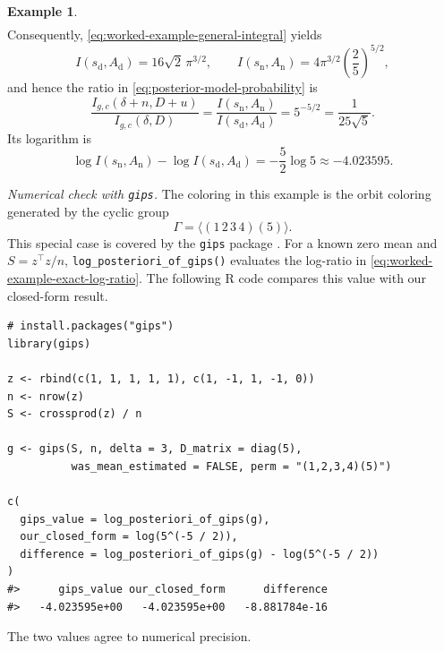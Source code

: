 \documentclass[12pt]{amsart}
\theoremstyle{plain}
\theoremstyle{definition}
\newtheorem{example}[theorem]{Example}
\theoremstyle{remark}
\newcommand{\1}{\mathbf{1}}
\begin{document}
\begin{example}
\[\begin{aligned}
\end{aligned}
\]
Consequently, \eqref{eq:worked-example-general-integral} yields
\[
I(s_{\mathrm{d}},A_{\mathrm{d}})
=16\sqrt2\,\pi^{3/2},
\qquad
I(s_{\mathrm{n}},A_{\mathrm{n}})
=4\pi^{3/2}\left(\frac25\right)^{5/2},
\]
and hence the ratio in \eqref{eq:posterior-model-probability} is
\begin{equation}\label{eq:worked-example-exact-ratio}
\frac{I_{g,c}(\delta+n,D+u)}{I_{g,c}(\delta,D)}
=\frac{I(s_{\mathrm{n}},A_{\mathrm{n}})}
{I(s_{\mathrm{d}},A_{\mathrm{d}})}
=5^{-5/2}=\frac{1}{25\sqrt5}.
\end{equation}
Its logarithm is
\begin{equation}\label{eq:worked-example-exact-log-ratio}
\log I(s_{\mathrm{n}},A_{\mathrm{n}})
-\log I(s_{\mathrm{d}},A_{\mathrm{d}})
=-\frac52\log5
\approx -4.023595.
\end{equation}


\noindent\emph{Numerical check with \texttt{gips}.}
The coloring in this example is the orbit coloring generated by the
cyclic group
\[
\Gamma=\langle(1\,2\,3\,4)(5)\rangle.
\]
This special case is covered by the \texttt{gips} package \citep{gips}.
For a known zero mean and $S=z^\top z/n$,
\texttt{log\_posteriori\_of\_gips()} evaluates the log-ratio in
\eqref{eq:worked-example-exact-log-ratio}.
The following R code compares this value with our closed-form result.

\noindent\begin{minipage}{\linewidth}
\begin{lstlisting}
# install.packages("gips")
library(gips)

z <- rbind(c(1, 1, 1, 1, 1), c(1, -1, 1, -1, 0))
n <- nrow(z)
S <- crossprod(z) / n

g <- gips(S, n, delta = 3, D_matrix = diag(5),
          was_mean_estimated = FALSE, perm = "(1,2,3,4)(5)")

c(
  gips_value = log_posteriori_of_gips(g),
  our_closed_form = log(5^(-5 / 2)),
  difference = log_posteriori_of_gips(g) - log(5^(-5 / 2))
)
#>      gips_value our_closed_form      difference
#>   -4.023595e+00   -4.023595e+00   -8.881784e-16
\end{lstlisting}
The two values agree to numerical precision.
\end{minipage}

\end{example}


\end{document}
